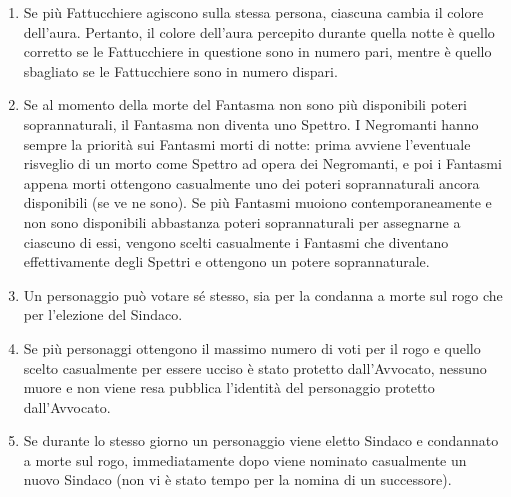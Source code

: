 \documentclass[a4paper,10pt]{article}
\begin{document}
\begin{enumerate}
 
 \item Se più Fattucchiere agiscono sulla stessa persona, ciascuna cambia il colore dell'aura. Pertanto, il colore dell'aura percepito durante quella notte è quello corretto se le Fattucchiere in questione sono in numero pari, mentre è quello sbagliato se le Fattucchiere sono in numero dispari.
 
 \item Se al momento della morte del Fantasma non sono più disponibili poteri soprannaturali, il Fantasma non diventa uno Spettro.
 I Negromanti hanno sempre la priorità sui Fantasmi morti di notte: prima avviene l'eventuale risveglio di un morto come Spettro ad opera dei Negromanti, e poi i Fantasmi appena morti ottengono casualmente uno dei poteri soprannaturali ancora disponibili (se ve ne sono).
 Se più Fantasmi muoiono contemporaneamente e non sono disponibili abbastanza poteri soprannaturali per assegnarne a ciascuno di essi, vengono scelti casualmente i Fantasmi che diventano effettivamente degli Spettri e ottengono un potere soprannaturale.
 
 \item Un personaggio può votare sé stesso, sia per la condanna a morte sul rogo che per l'elezione del Sindaco.
 
 \item Se più personaggi ottengono il massimo numero di voti per il rogo e quello scelto casualmente per essere ucciso è stato protetto dall'Avvocato, nessuno muore e non viene resa pubblica l'identità del personaggio protetto dall'Avvocato.
 
 \item Se durante lo stesso giorno un personaggio viene eletto Sindaco e condannato a morte sul rogo, immediatamente dopo viene nominato casualmente un nuovo Sindaco (non vi è stato tempo per la nomina di un successore).
 

\end{enumerate}
\end{document}
